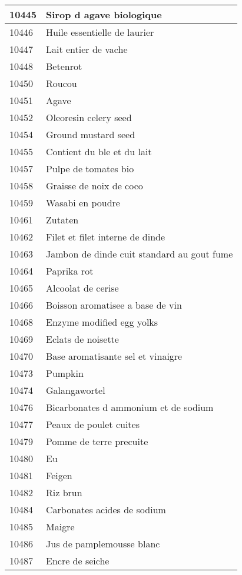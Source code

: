 \begin{longtable}{|l|l|}
10445 & Sirop d agave biologique \\ \hline 
10446 & Huile essentielle de laurier \\ \hline 
10447 & Lait entier de vache \\ \hline 
10448 & Betenrot \\ \hline 
10450 & Roucou \\ \hline 
10451 & Agave \\ \hline 
10452 & Oleoresin celery seed \\ \hline 
10454 & Ground mustard seed \\ \hline 
10455 & Contient du ble et du lait \\ \hline 
10457 & Pulpe de tomates bio \\ \hline 
10458 & Graisse de noix de coco \\ \hline 
10459 & Wasabi en poudre \\ \hline 
10461 & Zutaten \\ \hline 
10462 & Filet et filet interne de dinde \\ \hline 
10463 & Jambon de dinde cuit standard au gout fume \\ \hline 
10464 & Paprika rot \\ \hline 
10465 & Alcoolat de cerise \\ \hline 
10466 & Boisson aromatisee a base de vin \\ \hline 
10468 & Enzyme modified egg yolks \\ \hline 
10469 & Eclats de noisette \\ \hline 
10470 & Base aromatisante sel et vinaigre \\ \hline 
10473 & Pumpkin \\ \hline 
10474 & Galangawortel \\ \hline 
10476 & Bicarbonates d ammonium et de sodium \\ \hline 
10477 & Peaux de poulet cuites \\ \hline 
10479 & Pomme de terre precuite \\ \hline 
10480 & Eu \\ \hline 
10481 & Feigen \\ \hline 
10482 & Riz brun \\ \hline 
10484 & Carbonates acides de sodium \\ \hline 
10485 & Maigre \\ \hline 
10486 & Jus de pamplemousse blanc \\ \hline 
10487 & Encre de seiche \\ \hline 

\end{longtable}
